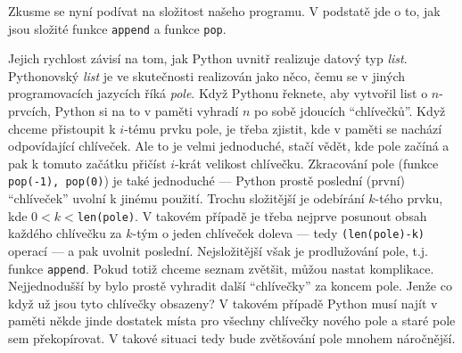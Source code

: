 Zkusme se nyní podívat na složitost našeho programu. V podstatě jde o to, jak jsou složité funkce {\tt append} a funkce {\tt pop}.

Jejich rychlost závisí na tom, jak Python uvnitř realizuje datový typ \emph{list}. Pythonovský \emph{list} je ve skutečnosti realizován 
jako něco, čemu se v jiných programovacích jazycích říká \emph{pole}. Když Pythonu řeknete, aby vytvořil list o 
$n$-prvcích, Python si na to v paměti vyhradí $n$ po sobě jdoucích ``chlívečků''. Když chceme přistoupit k $i$-tému prvku pole, je třeba
zjistit, kde v paměti se nachází odpovídající chlíveček. Ale to je velmi jednoduché, stačí vědět, kde pole začíná a pak k tomuto začátku přičíst
$i$-krát velikost chlívečku. Zkracování pole (funkce {\tt pop(-1), pop(0)}) je také jednoduché --- Python prostě poslední (první) ``chlíveček'' uvolní k
jinému použití. Trochu složitější je odebírání $k$-tého prvku, kde $0<k<${\tt len(pole)}. V takovém případě je třeba nejprve posunout obsah každého
chlívečku za $k$-tým o jeden chlíveček doleva --- tedy {\tt (len(pole)-k)} operací --- a pak uvolnit poslední. Nejsložitější však je prodlužování
pole, t.j. funkce {\tt append}. Pokud totiž chceme seznam zvětšit, můžou nastat komplikace. Nejjednodušší by bylo
prostě vyhradit další ``chlívečky'' za koncem pole. Jenže co když už jsou tyto chlívečky obsazeny? V takovém případě Python musí najít v paměti
někde jinde dostatek místa pro všechny chlívečky nového pole a staré pole sem překopírovat. V takové situaci tedy bude zvětšování pole mnohem náročnější.

